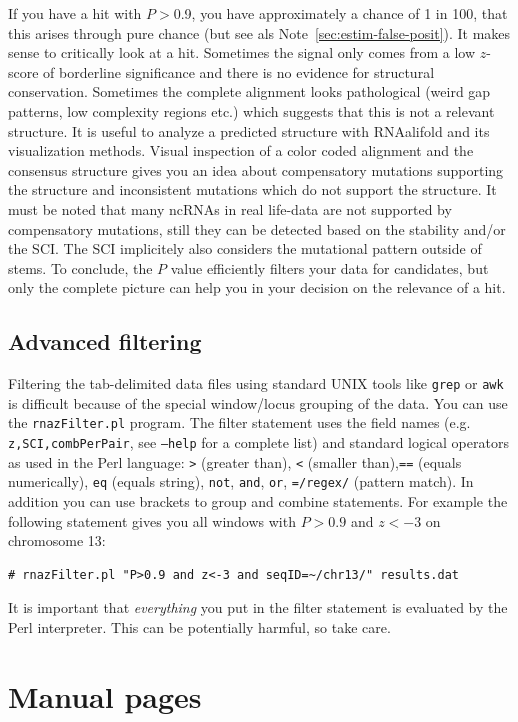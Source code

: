 \documentclass[11pt]{article}
\begin{document}
If you have a hit with $P>$0.9, you have approximately a chance of 1 in
100, that this arises through pure chance (but see als
Note~\ref{sec:estim-false-posit}). It makes sense to critically look at a
hit. Sometimes the signal only comes from a low $z$-score of borderline
significance and there is no evidence for structural conservation.
Sometimes the complete alignment looks pathological (weird gap patterns,
low complexity regions etc.) which suggests that this is not a relevant
structure. It is useful to analyze a predicted structure with RNAalifold
and its visualization methods. Visual inspection of a color coded alignment
and the consensus structure gives you an idea about compensatory mutations
supporting the structure and inconsistent mutations which do not support
the structure. It must be noted that many ncRNAs in real life-data are not
supported by compensatory mutations, still they can be detected based on
the stability and/or the SCI. The SCI implicitely also considers the
mutational pattern outside of stems. To conclude, the $P$ value efficiently
filters your data for candidates, but only the complete picture can help
you in your decision on the relevance of a hit.

\subsection{Advanced filtering}
\label{sec:formulating-filter}

Filtering the tab-delimited data files using standard UNIX tools like
\texttt{grep} or \texttt{awk} is difficult because of the special
window/locus grouping of the data. You can use the \texttt{rnazFilter.pl}
program. The filter statement uses the field names (e.g.
\texttt{z,SCI,combPerPair}, see \texttt{--help} for a complete list) and
standard logical operators as used in the Perl language: \texttt{>}
(greater than), \texttt{<} (smaller than),\texttt{==} (equals numerically),
\texttt{eq} (equals string), \texttt{not}, \texttt{and}, \texttt{or},
\texttt{=\raisebox{-0.7ex}{\~{ }}/regex/} (pattern match).  In addition you
can use brackets to group and combine statements. For example the following
statement gives you all windows with $P>0.9$ and $z<-3$ on chromosome 13:

\begin{verbatim}
# rnazFilter.pl "P>0.9 and z<-3 and seqID=~/chr13/" results.dat
\end{verbatim}

It is important that \emph{everything} you put in the filter statement is
evaluated by the Perl interpreter. This can be potentially harmful, so take
care.

\clearpage


\sf \small

\normalfont
\normalsize

\appendix

\section{Manual pages}
\label{sec:manual-pages}


\end{document}
